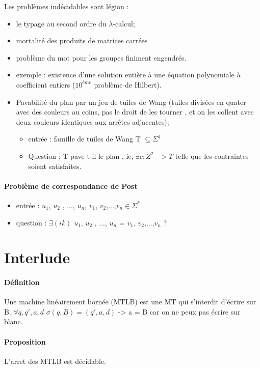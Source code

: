 \documentclass{article}
\begin{document}
{{Les problèmes indécidables sont légion : 
\begin{itemize}
\item le typage au second ordre du $\lambda$-calcul;
\item mortalité des produits de matrices carrées
\item problème du mot pour les groupes finiment engendrés.
\item exemple : existence d'une solution entière à une équation polynomiale à coefficient entiers ($10^{ème}$ problème de Hilbert).
\item Pavabilité du plan par un jeu de tuiles de Wang (tuiles divisées en quater avec des couleurs au coins, pas le droit de les tourner , et on les collent avec deux couleurs identiques aux arrêtes adjacentes);
\begin{itemize}
\item entrée : famille de tuiles de Wang T $\subseteq \Sigma^{4}$
\item Question : T pave-t-il le plan , ie, $\exists c : Z^{2} -> T$ telle que les contraintes soient satisfaites.
\end{itemize}
\end{itemize}

\paragraph{Problème de correspondance de Post} 
\begin{itemize}
\item entrée : $u_{1}$, $u_{2}$ , ..., $u_{n}$, $v_{1}$, $v_{2}$,...,$v_{n} \in \Sigma^{*}$
\item question : $\exists (ik)$ $u_{1}$, $u_{2}$ , ..., $u_{n}$ =  $v_{1}$, $v_{2}$,...,$v_{n}$ ?
\end{itemize}
\section{Interlude}
\paragraph{Définition} Une machine linéairement bornée (MTLB) est une MT qui s'interdit d’écrire sur B. $ \forall q,q',a,d$  $\sigma (q,B) = (q',a,d)$ -> a  = B car on ne peux pas écrire sur blanc.
\paragraph{Proposition} L'arret des MTLB est décidable.
}}
\end{document}
